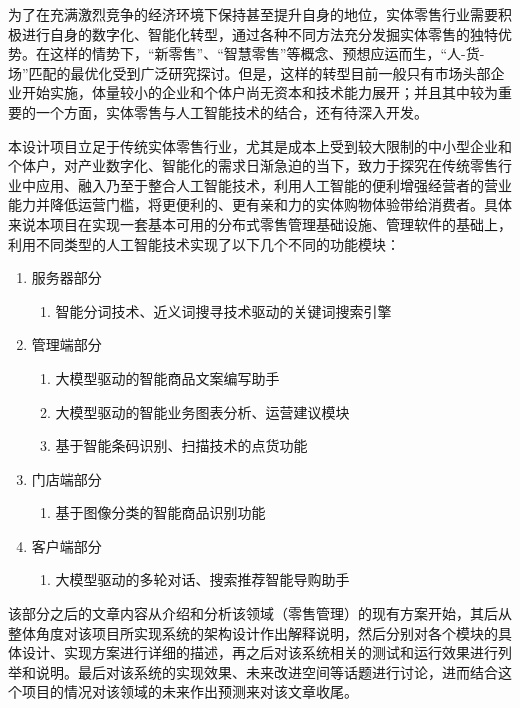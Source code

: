 为了在充满激烈竞争的经济环境下保持甚至提升自身的地位，实体零售行业需要积极进行自身的数字化、智能化转型，通过各种不同方法充分发掘实体零售的独特优势。在这样的情势下，“新零售”\cite{zhao2017new_retail,du2017new_retail}、“智慧零售”\cite{liao2019intelligent_retail}等概念、预想应运而生，“人-货-场”匹配的最优化\cite{wang2018person_good_place}受到广泛研究探讨。但是，这样的转型目前一般只有市场头部企业开始实施，体量较小的企业和个体户尚无资本和技术能力展开；并且其中较为重要的一个方面，实体零售与人工智能技术的结合，还有待深入开发。

本设计项目立足于传统实体零售行业，尤其是成本上受到较大限制的中小型企业和个体户，对产业数字化、智能化的需求日渐急迫的当下，致力于探究在传统零售行业中应用、融入乃至于整合人工智能技术，利用人工智能的便利增强经营者的营业能力并降低运营门槛，将更便利的、更有亲和力的实体购物体验带给消费者。具体来说本项目在实现一套基本可用的分布式零售管理基础设施、管理软件的基础上，利用不同类型的人工智能技术实现了以下几个不同的功能模块：

\begin{enumerate}
    \item 服务器部分
    \begin{enumerate}
        \item 智能分词技术、近义词搜寻技术驱动的关键词搜索引擎
    \end{enumerate}
    \item 管理端部分
    \begin{enumerate}
        \item 大模型驱动的智能商品文案编写助手
        \item 大模型驱动的智能业务图表分析、运营建议模块
        \item 基于智能条码识别、扫描技术的点货功能
    \end{enumerate}
    \item 门店端部分
    \begin{enumerate}
        \item 基于图像分类的智能商品识别功能
    \end{enumerate}
    \item 客户端部分
    \begin{enumerate}
        \item 大模型驱动的多轮对话、搜索推荐智能导购助手
    \end{enumerate}
\end{enumerate}

该部分之后的文章内容从介绍和分析该领域（零售管理）的现有方案开始，其后从整体角度对该项目所实现系统的架构设计作出解释说明，然后分别对各个模块的具体设计、实现方案进行详细的描述，再之后对该系统相关的测试和运行效果进行列举和说明。最后对该系统的实现效果、未来改进空间等话题进行讨论，进而结合这个项目的情况对该领域的未来作出预测来对该文章收尾。

